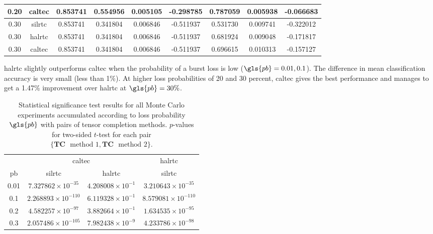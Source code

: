 \begin{table}[H]
\begin{adjustbox}{max width=\textwidth}
\begin{tabular}{|c|c|c|ccc|ccc|}
			0.20 & \cellcolor{green!25}\gls{caltec} & 0.853741 &  0.554956 &  0.005105 & -0.298785 & \cellcolor{green!25}0.787059 &    0.005938 &   \cellcolor{green!25}-0.066683 \\
			\hline
			0.30 & \gls{silrtc} &  0.853741 &  0.341804 &  0.006846 & -0.511937 &     0.531730 &    0.009741 &   -0.322012 \\
			0.30 & \gls{halrtc} & 0.853741 &  0.341804 &  0.006846 & -0.511937 & 0.681924 &    0.009048 &   -0.171817 \\
			0.30 & \cellcolor{green!25}\gls{caltec} & 0.853741 &  0.341804 &  0.006846 & -0.511937 & \cellcolor{green!25}0.696615 &    0.010313 &  \cellcolor{green!25} -0.157127  \\
			\hline
		\end{tabular}
	\end{adjustbox}
\end{table}

\gls{halrtc} slightly outperforms \gls{caltec} when the probability of a burst loss is low ($\gls{pb} = 0.01, 0.1$). The difference in mean classification accuracy is very small (less than 1\%). At higher loss probabilities of 20 and 30 percent, \gls{caltec} gives the best performance and manages to get a 1.47\% improvement over \gls{halrtc} at $\gls{pb}= 30\%$.

\begin{table}[H]
	\caption[Statistical significance test results for all Monte Carlo experiments accumulated according to loss probability]{Statistical significance test results for all Monte Carlo experiments accumulated according to loss probability $\gls{pb}$ with pairs of tensor completion methods. $p$-values for two-sided $t$-test for each pair  $\{\textbf{TC} \mbox{ } \text{method 1},\textbf{TC} \mbox{ } \text{method 2}\}$.} \label{table:expts:mc:all}
	\centering
		\begin{adjustbox}{max width = \textwidth}
		\begin{tabular}{|c|cc|c|}
			\hline
			\multicolumn{1}{|c|}{} &
			\multicolumn{2}{c|}{\gls{caltec}} & \multicolumn{1}{c|}{\gls{halrtc}} \\
			\gls{pb} &  \gls{silrtc} &  \gls{halrtc} &  \gls{silrtc} \\
			\hline \hline 
		0.01 &     $7.327862 \times 10^{-35}$ &    \cellcolor{red!40} $4.208008 \times 10^{-1}$ &     $3.210643 \times 10^{-35}$ \\
		0.1 &    $2.268893 \times 10^{-110}$ &   \cellcolor{red!40} $6.119328 \times 10^{-1}$ &   $8.579081 \times 10^{-110}$ \\
		0.2 &     $4.582257 \times 10^{-97}$ &    \cellcolor{red!40} $3.882664 \times 10^{-1}$ &     $1.634535 \times 10^{-95}$ \\
		0.3 &    $2.057486 \times 10^{-105}$ &     $7.982438 \times 10^{-9}$ &     $4.233786 \times 10^{-98}$ \\
			\hline
		\end{tabular}%
	\end{adjustbox}
\end{table}

